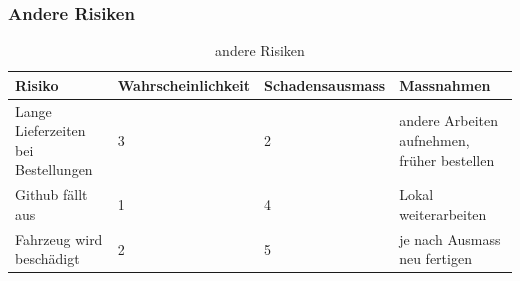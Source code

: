 \subsubsection{Andere Risiken}
\begin{table}[H]
\begin{tabular}{|p{}|p{}|p{}|p{}|}\hline
	\textbf{Risiko}	& 	\textbf{Wahrscheinlichkeit} & \textbf{Schadensausmass}  & \textbf{Massnahmen} \\\hline
	Lange Lieferzeiten bei Bestellungen	&	3	&	2	& andere Arbeiten aufnehmen, früher bestellen  \\\hline
	Github fällt aus	&	1	&	4	& Lokal weiterarbeiten  \\\hline
	Fahrzeug wird beschädigt	&	2	&	5	& je nach Ausmass neu fertigen  \\\hline
\end{tabular}
\caption{andere Risiken}
\end{table}